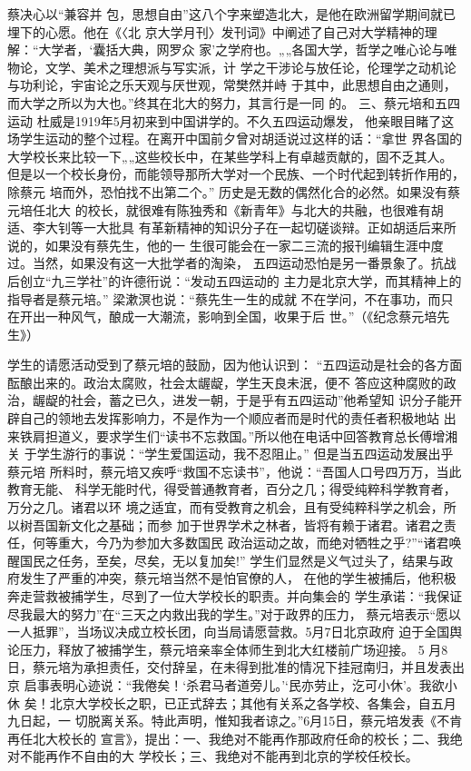 \documentclass[11pt]{ctexart}
\begin{document}
{{{{蔡决心以“兼容并
包，思想自由”这八个字来塑造北大，是他在欧洲留学期间就已埋下的心愿。他在《〈北
京大学月刊〉发刊词》中阐述了自己对大学精神的理解：“大学者，‘囊括大典，网罗众
家’之学府也。„„各国大学，哲学之唯心论与唯物论，文学、美术之理想派与写实派，计
学之干涉论与放任论，伦理学之动机论与功利论，宇宙论之乐天观与厌世观，常樊然并峙
于其中，此思想自由之通则，而大学之所以为大也。”终其在北大的努力，其言行是一同
的。  三、蔡元培和五四运动  杜威是1919年5月初来到中国讲学的。不久五四运动爆发，
他亲眼目睹了这场学生运动的整个过程。在离开中国前夕曾对胡适说过这样的话：“拿世
界各国的大学校长来比较一下„„这些校长中，在某些学科上有卓越贡献的，固不乏其人。
但是以一个校长身份，而能领导那所大学对一个民族、一个时代起到转折作用的，除蔡元
培而外，恐怕找不出第二个。”  历史是无数的偶然化合的必然。如果没有蔡元培任北大
的校长，就很难有陈独秀和《新青年》与北大的共融，也很难有胡适、李大钊等一大批具
有革新精神的知识分子在一起切磋谈辩。正如胡适后来所说的，如果没有蔡先生，他的一
生很可能会在一家二三流的报刊编辑生涯中度过。当然，如果没有这一大批学者的淘染，
五四运动恐怕是另一番景象了。抗战后创立“九三学社”的许德衎说：“发动五四运动的
主力是北京大学，而其精神上的指导者是蔡元培。” 梁漱溟也说：“蔡先生一生的成就
不在学问，不在事功，而只在开出一种风气，酿成一大潮流，影响到全国，收果于后
世。”（《纪念蔡元培先生》）

学生的请愿活动受到了蔡元培的鼓励，因为他认识到：
“五四运动是社会的各方面酝酿出来的。政治太腐败，社会太龌龊，学生天良未泯，便不
答应这种腐败的政治，龌龊的社会，蓄之已久，进发一朝，于是乎有五四运动”他希望知
识分子能开辟自己的领地去发挥影响力，不是作为一个顺应者而是时代的责任者积极地站
出来铁肩担道义，要求学生们“读书不忘救国。”所以他在电话中回答教育总长傅增湘关
于学生游行的事说：“学生爱国运动，我不忍阻止。”  但是当五四运动发展出乎蔡元培
所料时，蔡元培又疾呼“救国不忘读书”，他说：“吾国人口号四万万，当此教育无能、
科学无能时代，得受普通教育者，百分之几；得受纯粹科学教育者，万分之几。诸君以环
境之适宜，而有受教育之机会，且有受纯粹科学之机会，所以树吾国新文化之基础；而参
加于世界学术之林者，皆将有赖于诸君。诸君之责任，何等重大，今乃为参加大多数国民
政治运动之故，而绝对牺牲之乎?”“诸君唤醒国民之任务，至矣，尽矣，无以复加矣!”
学生们显然是义气过头了，结果与政府发生了严重的冲突，蔡元培当然不是怕官僚的人，
在他的学生被捕后，他积极奔走营救被捕学生，尽到了一位大学校长的职责。并向集会的
学生承诺：“我保证尽我最大的努力”在“三天之内救出我的学生。”对于政界的压力，
蔡元培表示“愿以一人抵罪”，当场议决成立校长团，向当局请愿营救。5月7日北京政府
迫于全国舆论压力，释放了被捕学生，蔡元培亲率全体师生到北大红楼前广场迎接。  5
月8日，蔡元培为承担责任，交付辞呈，在未得到批准的情况下挂冠南归，并且发表出京
启事表明心迹说：“我倦矣！‘杀君马者道旁儿。’‘民亦劳止，汔可小休’。我欲小休
矣！北京大学校长之职，已正式辞去；其他有关系之各学校、各集会，自五月九日起，一
切脱离关系。特此声明，惟知我者谅之。”6月15日，蔡元培发表《不肯再任北大校长的
宣言》，提出：一、我绝对不能再作那政府任命的校长；二、我绝对不能再作不自由的大
学校长；三、我绝对不能再到北京的学校任校长。

}}}}
\end{document}
